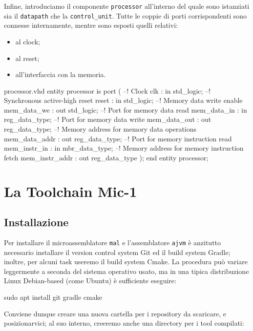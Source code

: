 \documentclass[a4paper,12pt]{scrreprt}
\begin{document}
Infine, introduciamo il componente \lstinline{processor} all'interno del quale
sono istanziati sia il \lstinline{datapath} che la \lstinline{control_unit}.
Tutte le coppie di porti corrispondenti sono connesse internamente, mentre sono
esposti quelli relativi:
\begin{itemize}
  \item al clock;
  \item al reset;
  \item all'interfaccia con la memoria.
\end{itemize}

\begin{myvhdl}{processor.vhd}
entity processor is
  port (
    --! Clock
    clk            : in  std_logic;
    --! Synchronous active-high reset
    reset          : in  std_logic;
    --! Memory data write enable
    mem_data_we    : out std_logic;
    --! Port for memory data read
    mem_data_in    : in  reg_data_type;
    --! Port for memory data write
    mem_data_out   : out reg_data_type;
    --! Memory address for memory data operations
    mem_data_addr  : out reg_data_type;
    --! Port for memory instruction read
    mem_instr_in   : in  mbr_data_type;
    --! Memory address for memory instruction fetch
    mem_instr_addr : out reg_data_type
    );
end entity processor;
\end{myvhdl}

\chapter{La Toolchain Mic-1}

\section{Installazione}

Per installare il microassemblatore \lstinline{mal} e l'assemblatore
\lstinline{ajvm} è anzitutto necessario installare il version control system Git
ed il build system Gradle; inoltre, per alcuni task useremo il build system
Cmake. La procedura può variare leggermente a seconda del sistema operativo
usato, ma in una tipica distribuzione Linux Debian-based (come Ubuntu) è
sufficiente eseguire:

\begin{commandshell}
sudo apt install git gradle cmake
\end{commandshell}

Conviene dunque creare una nuova cartella per i repository da scaricare, e
posizionarvici; al suo interno, creeremo anche una directory per i tool compilati:
\end{document}
